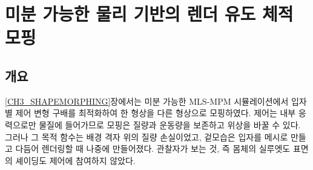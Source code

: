 
\clearpage %
\chapter{미분 가능한 물리 기반의 렌더 유도 체적 모핑}\label{CH4_PhysMorphGS_ko}
\usetikzlibrary{positioning,arrows.meta,fit,calc}

\section{개요}
\label{ch4:sec_overview_ko}

\ref{CH3_SHAPEMORPHING}장에서는 미분 가능한 MLS-MPM 시뮬레이션에서 입자별 제어 변형 구배를 최적화하여 한 형상을
다른 형상으로 모핑하였다. 제어는 내부 응력으로만 물질에 들어가므로 모핑은 질량과 운동량을 보존하고 위상을 바꿀 수 있다.
그러나 그 목적 함수는 배경 격자 위의 질량 손실이었고, 겉모습은 입자를 메시로 만들고 다듬어 렌더링할 때 나중에
만들어졌다. 관찰자가 보는 것, 즉 몸체의 실루엣도 표면의 셰이딩도 제어에 참여하지 않았다.

